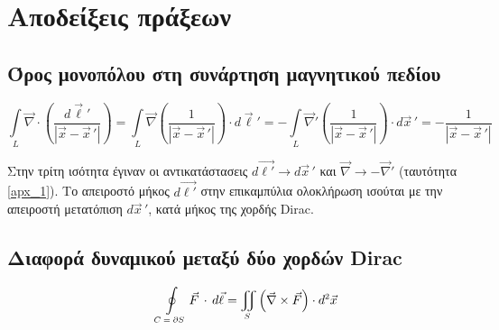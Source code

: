 \newpage
\section{Αποδείξεις πράξεων}
\subsection{Όρος μονοπόλου στη συνάρτηση μαγνητικού πεδίου}
\begin{equation}\label{apx_5}
    \int\limits_L\vec{\nabla}\cdot\left(\frac{d\Vec{\ell}'}{|\Vec{x}-\Vec{x}\,'|}\right) = \int\limits_L\vec{\nabla}\left(\frac{1}{|\Vec{x}-\Vec{x}\,'|}\right)\cdot d\Vec{\ell}' = - \int\limits_L\vec{\nabla}'\left(\frac{1}{|\Vec{x}-\Vec{x}\,'|}\right)\cdot d\Vec{x}\,' = - \frac{1}{|\vec{x}-\vec{x}\,'|}
\end{equation}
\begin{note}[\ref{apx_5}]
    Στην τρίτη ισότητα έγιναν οι αντικατάστασεις $d\vec{\ell'} \rightarrow d\vec{x}\,'$ και $\vec{\nabla}\rightarrow-\vec{\nabla}'$ (ταυτότητα \eqref{apx_1}). Το απειροστό μήκος $d\vec{\ell'}$ στην επικαμπύλια ολοκλήρωση ισούται με την απειροστή μετατόπιση %
    $d\vec{x}\,'$, κατά μήκος της χορδής Dirac.
\end{note}

\subsection{Διαφορά δυναμικού μεταξύ δύο χορδών Dirac}\label{apx22}
\begin{theorem}[Stokes]
\begin{equation}\label{stokes}
    \qquad\oint\limits\subscr{C=\partial S} \vec{F} \, \cdot \,d\vec{\ell} = \iint\limits\subscr{S}\left(\vec{\nabla}\times\vec{F}\right)\cdot d\superscr{2}\vec{x}
\end{equation}    
\end{theorem}

